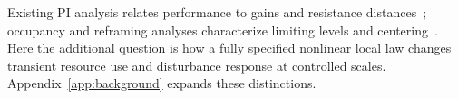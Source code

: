 Existing PI analysis relates performance to gains and resistance
distances~\cite{lall2022resistance}; occupancy and reframing analyses
characterize limiting levels and centering~\cite{lall2024bufferOccupancy,lall2023bufferCentering}.
Here the additional question is how a fully specified nonlinear local
law changes transient resource use and disturbance response at
controlled scales. Appendix~\ref{app:background} expands these distinctions.
